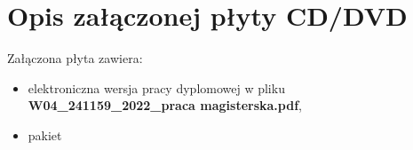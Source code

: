 \chapter{Opis załączonej płyty CD/DVD}
Załączona płyta zawiera:
\begin{itemize}
    \item elektroniczna wersja pracy dyplomowej w pliku \textbf{W04\_241159\_2022\_praca magisterska.pdf},
    \item pakiet
\end{itemize}
